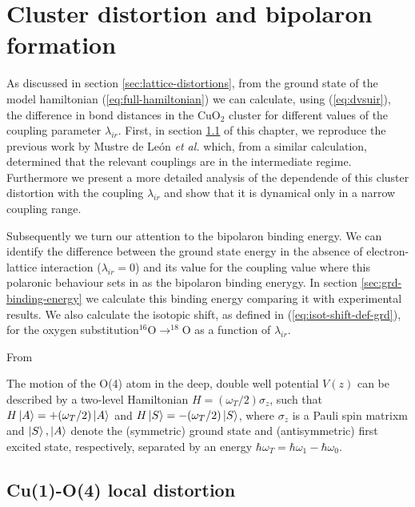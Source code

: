\chapter{Cluster distortion and bipolaron formation}
\label{chap:ground}

As discussed in section \ref{sec:lattice-distortions}, from the ground state of the model hamiltonian (\ref{eq:full-hamiltonian}) we can calculate, using (\ref{eq:dvsuir}), the difference in bond distances in the CuO$_2$ cluster for different values of the coupling parameter $\lambda_{ir}$.
First, in section \ref{sec:grd-phonon-proj} of this chapter, we reproduce the previous work by Mustre de Le\'{o}n \textit{et al.} \cite{MustredeLeon1992} which, from a similar calculation, determined that the relevant couplings are in the intermediate regime. Furthermore we present a more detailed analysis of the dependende of this cluster distortion with the coupling $\lambda_{ir}$ and show that it is dynamical only in a narrow coupling range.

Subsequently we turn our attention to the bipolaron binding energy. 
We can identify the difference between the ground state energy in the absence of electron-lattice interaction ($\lambda_{ir}=0$) and its value for the coupling value where this polaronic behaviour sets in as the bipolaron binding enerygy.
In section \ref{sec:grd-binding-energy} we calculate this binding energy comparing it with experimental results.
We also calculate the isotopic shift, as defined in (\ref{eq:isot-shift-def-grd}), for the oxygen substitution$^{16}$O$\rightarrow ^{18}$O as a function of $\lambda_{ir}$.


From \cite{Conradson1990}

The motion of the O(4) atom in the deep, double well potential $V(z)$ can be described by a two-level Hamiltonian $H=(\omega_T/2)\sigma_z$,  such that $H\left | A \right\rangle=+(\omega_T/2)\left | A \right\rangle$ and $H\left | S \right\rangle=-(\omega_T/2)\left | S \right\rangle$, where $\sigma_z$ is a Pauli spin matrixm and $\left | S \right\rangle,\left | A \right\rangle$ denote the (symmetric) ground state and (antisymmetric) first excited state, respectively, separated by an energy $\hbar\omega_T=\hbar\omega_1-\hbar\omega_0$.




\section{Cu(1)-O(4) local distortion}
\label{sec:grd-phonon-proj}

